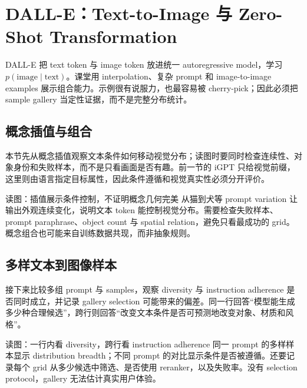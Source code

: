 \section{DALL-E：Text-to-Image 与 Zero-Shot Transformation}

DALL-E 把 text token 与 image token 放进统一 autoregressive model，学习 $p(\text{image}\mid\text{text})$。课堂用 interpolation、复杂 prompt 和 image-to-image examples 展示组合能力。示例很有说服力，也最容易被 cherry-pick；因此必须把 sample gallery 当定性证据，而不是完整分布统计。

\subsection{概念插值与组合}

本节先从概念插值观察文本条件如何移动视觉分布；读图时要同时检查连续性、对象身份和失败样本，而不是只看画面是否有趣。前一节的 iGPT 只给视觉前缀，这里则由语言指定目标属性，因此条件遵循和视觉真实性必须分开评价。


\begin{knowledgebox}{读图：插值展示条件控制，不证明概念几何完美}
从猫到犬等 prompt variation 让输出外观连续变化，说明文本 token 能控制视觉分布。需要检查失败样本、prompt paraphrase、object count 与 spatial relation，避免只看最成功的 grid。概念组合也可能来自训练数据共现，而非抽象规则。
\end{knowledgebox}

\subsection{多样文本到图像样本}

接下来比较多组 prompt 与 samples，观察 diversity 与 instruction adherence 是否同时成立，并记录 gallery selection 可能带来的偏差。同一行回答“模型能生成多少种合理候选”，跨行则回答“改变文本条件是否可预测地改变对象、材质和风格”。


\begin{knowledgebox}{读图：一行内看 diversity，跨行看 instruction adherence}
同一 prompt 的多样样本显示 distribution breadth；不同 prompt 的对比显示条件是否被遵循。还要记录每个 grid 从多少候选中筛选、是否使用 reranker，以及失败率。没有 selection protocol，gallery 无法估计真实用户体验。
\end{knowledgebox}

